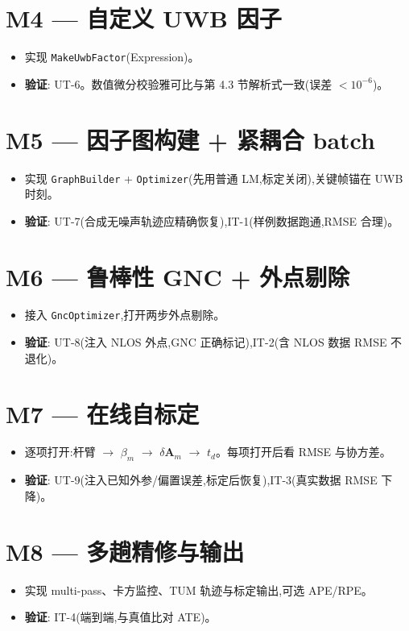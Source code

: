 \documentclass[11pt,a4paper]{report}
\newcommand{\bA}{\bm{A}}
\begin{document}
\section*{M4 — 自定义 UWB 因子}
\begin{itemize}[leftmargin=2em]
  \item 实现 \texttt{MakeUwbFactor}(Expression)。
  \item \textbf{验证}: UT-6。数值微分校验雅可比与第 4.3 节解析式一致(误差 $<10^{-6}$)。
\end{itemize}

\section*{M5 — 因子图构建 + 紧耦合 batch}
\begin{itemize}[leftmargin=2em]
  \item 实现 \texttt{GraphBuilder} + \texttt{Optimizer}(先用普通 LM,标定关闭),关键帧锚在 UWB 时刻。
  \item \textbf{验证}: UT-7(合成无噪声轨迹应精确恢复),IT-1(样例数据跑通,RMSE 合理)。
\end{itemize}

\section*{M6 — 鲁棒性 GNC + 外点剔除}
\begin{itemize}[leftmargin=2em]
  \item 接入 \texttt{GncOptimizer},打开两步外点剔除。
  \item \textbf{验证}: UT-8(注入 NLOS 外点,GNC 正确标记),IT-2(含 NLOS 数据 RMSE 不退化)。
\end{itemize}

\section*{M7 — 在线自标定}
\begin{itemize}[leftmargin=2em]
  \item 逐项打开:杆臂 $\to$ $\beta_m$ $\to$ $\delta\bA_m$ $\to$ $t_d$。每项打开后看 RMSE 与协方差。
  \item \textbf{验证}: UT-9(注入已知外参/偏置误差,标定后恢复),IT-3(真实数据 RMSE 下降)。
\end{itemize}

\section*{M8 — 多趟精修与输出}
\begin{itemize}[leftmargin=2em]
  \item 实现 multi-pass、卡方监控、TUM 轨迹与标定输出,可选 APE/RPE。
  \item \textbf{验证}: IT-4(端到端,与真值比对 ATE)。
\end{itemize}
\end{document}
